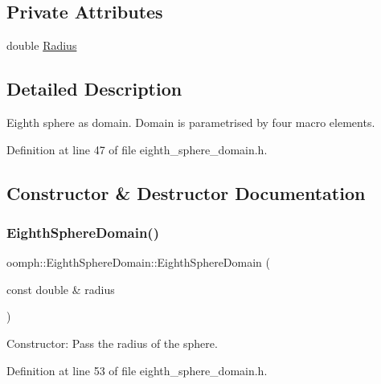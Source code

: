 \subsection*{Private Attributes}
\begin{DoxyCompactItemize}
\item 
double \hyperlink{classoomph_1_1EighthSphereDomain_a9ef9d21c2c9ed0ea28652011b1756419}{Radius}
\end{DoxyCompactItemize}


\subsection{Detailed Description}
Eighth sphere as domain. Domain is parametrised by four macro elements. 

Definition at line 47 of file eighth\+\_\+sphere\+\_\+domain.\+h.



\subsection{Constructor \& Destructor Documentation}
\mbox{\label{classoomph_1_1EighthSphereDomain_a82c8a6b479e41bf07b9478e3d903b465}} 
\subsubsection{\texorpdfstring{Eighth\+Sphere\+Domain()}{EighthSphereDomain()}\hspace{0.1cm}{\footnotesize\ttfamily [1/2]}}
{\footnotesize\ttfamily oomph\+::\+Eighth\+Sphere\+Domain\+::\+Eighth\+Sphere\+Domain (\begin{DoxyParamCaption}\item[{const double \&}]{radius }\end{DoxyParamCaption})\hspace{0.3cm}{\ttfamily [inline]}}



Constructor\+: Pass the radius of the sphere. 



Definition at line 53 of file eighth\+\_\+sphere\+\_\+domain.\+h.

